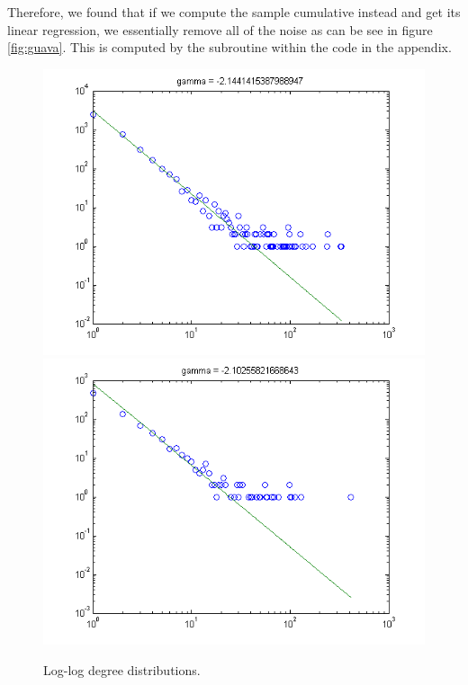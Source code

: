\documentclass[11pt,a4paper,twocolumn]{article}
\begin{document}
\begin{singlespace}
Therefore, we found that if we compute the sample cumulative instead and get its
linear regression, we essentially remove all of the noise as can be see in figure
\ref{fig:guava}.
This is computed by the  subroutine within the code in
the appendix.
\begin{figure}
\centering
\caption{Log-log degree distributions.\label{fig:deg}}
\includegraphics[scale=0.5]{images/antlr}
\includegraphics[scale=0.5]{images/JUNIT}


\end{figure}
\end{singlespace}
\end{document}
